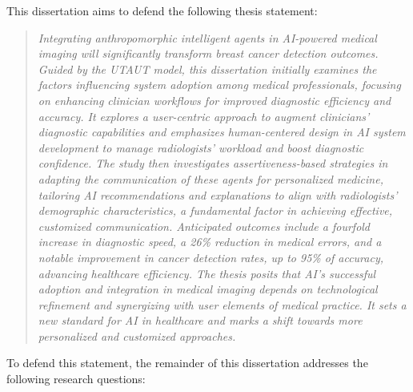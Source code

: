 \noindent
This dissertation aims to defend the following thesis statement:

\begin{quote}
{\it
\textcolor{revised}{Integrating anthropomorphic intelligent agents in \ac{AI}-powered medical imaging will significantly transform breast cancer detection outcomes.
Guided by the \ac{UTAUT} model, this dissertation initially examines the factors influencing system adoption among medical professionals, focusing on enhancing clinician workflows for improved diagnostic efficiency and accuracy.
It explores a user-centric approach to augment clinicians' diagnostic capabilities and emphasizes human-centered design in \ac{AI} system development to manage radiologists' workload and boost diagnostic confidence.
The study then investigates assertiveness-based strategies in adapting the communication of these agents for personalized medicine, tailoring \ac{AI} recommendations and explanations to align with radiologists' demographic characteristics, a fundamental factor in achieving effective, customized communication.
Anticipated outcomes include a fourfold increase in diagnostic speed, a 26\% reduction in medical errors, and a notable improvement in cancer detection rates, up to 95\% of accuracy, advancing healthcare efficiency.
The thesis posits that \ac{AI}'s successful adoption and integration in medical imaging depends on technological refinement and synergizing with user elements of medical practice.
It sets a new standard for \ac{AI} in healthcare and marks a shift towards more personalized and customized approaches.}
}
\end{quote}

\noindent
To defend this statement, the remainder of this dissertation addresses the following research questions:

